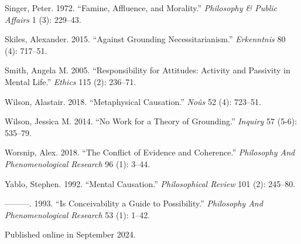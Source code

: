 \documentclass[
  10pt,
  letterpaper,
  DIV=11,
  numbers=noendperiod,
  twoside]{scrartcl}
\newlength{\cslhangindent}
\newenvironment{CSLReferences}[2] %
 {\begin{list}{}{%
  \setlength{\itemindent}{0pt}
  \setlength{\leftmargin}{0pt}
  \setlength{\parsep}{0pt}
  \ifodd #1
   \setlength{\leftmargin}{\cslhangindent}
   \setlength{\itemindent}{-1\cslhangindent}
  \fi
  \setlength{\itemsep}{#2\baselineskip}}}
 {\end{list}}
\begin{document}
\begin{CSLReferences}{1}{0}
Singer, Peter. 1972. {``Famine, Affluence, and Morality.''}
\emph{Philosophy \& Public Affairs} 1 (3): 229--43.

Skiles, Alexander. 2015. {``Against Grounding Necessitarianism.''}
\emph{Erkenntnis} 80 (4): 717--51.

Smith, Angela M. 2005. {``Responsibility for Attitudes: Activity and
Passivity in Mental Life.''} \emph{Ethics} 115 (2): 236--71.

Wilson, Alastair. 2018. {``Metaphysical Causation.''} \emph{Noûs} 52
(4): 723--51.

Wilson, Jessica M. 2014. {``No Work for a Theory of Grounding.''}
\emph{Inquiry} 57 (5-6): 535--79.

Worsnip, Alex. 2018. {``The Conflict of Evidence and Coherence.''}
\emph{Philosophy And Phenomenological Research} 96 (1): 3--44.

Yablo, Stephen. 1992. {``Mental Causation.''} \emph{Philosophical
Review} 101 (2): 245--80.

---------. 1993. {``Is Conceivability a Guide to Possibility.''}
\emph{Philosophy And Phenomenological Research} 53 (1): 1--42.

\end{CSLReferences}



\noindent Published online in September 2024.
\end{document}
